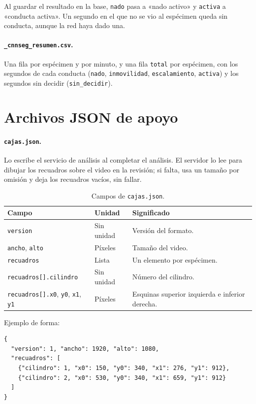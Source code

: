 Al guardar el resultado en la base, \texttt{nado} pasa a «nado activo» y \texttt{activa}
a «conducta activa». Un segundo en el que no se vio al espécimen queda sin conducta,
aunque la red haya dado una.

\paragraph{\texttt{\_cnnseg\_resumen.csv}.} Una fila por espécimen y por minuto, y una
fila \texttt{total} por espécimen, con los segundos de cada conducta
(\texttt{nado}, \texttt{inmovilidad}, \texttt{escalamiento}, \texttt{activa}) y los
segundos sin decidir (\texttt{sin\_decidir}).

\section{Archivos JSON de apoyo}

\paragraph{\texttt{cajas.json}.} Lo escribe el servicio de análisis al completar el
análisis. El servidor lo lee para dibujar los recuadros sobre el video en la revisión;
si falta, usa un tamaño por omisión y deja los recuadros vacíos, sin fallar.

\begin{table}[H]
\centering
\caption{Campos de \texttt{cajas.json}.}
\label{tab:ap_cajas}
\begin{tabular}{|p{4.6cm}|p{2.2cm}|p{7.0cm}|}
\hline
\textbf{Campo} & \textbf{Unidad} & \textbf{Significado} \\
\hline
\texttt{version} & Sin unidad & Versión del formato. \\
\hline
\texttt{ancho}, \texttt{alto} & Píxeles & Tamaño del video. \\
\hline
\texttt{recuadros} & Lista & Un elemento por espécimen. \\
\hline
\texttt{recuadros[].cilindro} & Sin unidad & Número del cilindro. \\
\hline
\texttt{recuadros[].x0}, \texttt{y0}, \texttt{x1}, \texttt{y1} & Píxeles & Esquinas
superior izquierda e inferior derecha. \\
\hline
\end{tabular}
\end{table}

Ejemplo de forma:

\begin{verbatim}
{
  "version": 1, "ancho": 1920, "alto": 1080,
  "recuadros": [
    {"cilindro": 1, "x0": 150, "y0": 340, "x1": 276, "y1": 912},
    {"cilindro": 2, "x0": 530, "y0": 340, "x1": 659, "y1": 912}
  ]
}
\end{verbatim}

